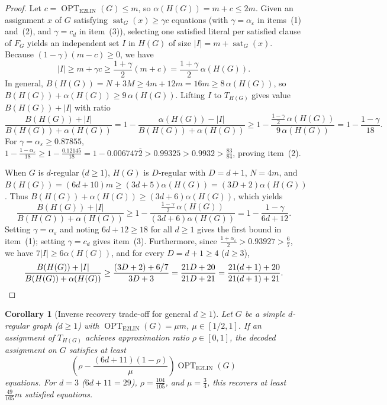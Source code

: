 \documentclass[11pt]{amsart}
\newtheorem{corollary}[theorem]{Corollary}
\begin{document}
\begin{proof}
Let $c = \operatorname{OPT}_{\mathrm{E2LIN}}(G) \le m$, so $\alpha(H(G)) = m + c \le 2m$. Given an assignment $x$ of $G$ satisfying $\operatorname{sat}_G(x) \ge \gamma c$ equations (with $\gamma = \alpha_\varepsilon$ in items~(1) and~(2), and $\gamma = c_d$ in item~(3)), selecting one satisfied literal per satisfied clause of $F_G$ yields an independent set $I$ in $H(G)$ of size $|I| = m + \operatorname{sat}_G(x)$. Because $(1-\gamma)(m-c) \ge 0$, we have
\[
|I| \ge m + \gamma c \ge \frac{1+\gamma}{2}(m+c) = \frac{1+\gamma}{2}\,\alpha(H(G)).
\]
In general, $B(H(G)) = N + 3M \ge 4m + 12m = 16m \ge 8\,\alpha(H(G))$, so $B(H(G)) + \alpha(H(G)) \ge 9\,\alpha(H(G))$. Lifting $I$ to $T_{H(G)}$ gives value $B(H(G)) + |I|$ with ratio
\[
\frac{B(H(G))+|I|}{B(H(G))+\alpha(H(G))} = 1 - \frac{\alpha(H(G)) - |I|}{B(H(G))+\alpha(H(G))} \ge 1 - \frac{\frac{1-\gamma}{2}\,\alpha(H(G))}{9\,\alpha(H(G))} = 1 - \frac{1-\gamma}{18}.
\]
For $\gamma = \alpha_\varepsilon \ge 0.87855$, $1 - \frac{1-\alpha_\varepsilon}{18} \ge 1 - \frac{0.12145}{18} = 1 - 0.006747\overline{2} > 0.99325 > 0.9932 > \frac{83}{84}$, proving item~(2).

When $G$ is $d$-regular ($d \ge 1$), $H(G)$ is $D$-regular with $D = d+1$, $N = 4m$, and $B(H(G)) = (6d+10)m \ge (3d+5)\alpha(H(G)) = (3D+2)\alpha(H(G))$. Thus $B(H(G)) + \alpha(H(G)) \ge (3d+6)\alpha(H(G))$, which yields
\[
\frac{B(H(G))+|I|}{B(H(G))+\alpha(H(G))} \ge 1 - \frac{\frac{1-\gamma}{2}\,\alpha(H(G))}{(3d+6)\alpha(H(G))} = 1 - \frac{1-\gamma}{6d+12}.
\]
Setting $\gamma = \alpha_\varepsilon$ and noting $6d+12 \ge 18$ for all $d \ge 1$ gives the first bound in item~(1); setting $\gamma = c_d$ gives item~(3). Furthermore, since $\frac{1+\alpha_\varepsilon}{2} > 0.93927 > \frac{6}{7}$, we have $7|I| \ge 6\alpha(H(G))$, and for every $D = d+1 \ge 4$ ($d \ge 3$),
\[
\frac{B(H(G))+|I|}{B(H(G))+\alpha(H(G))} \ge \frac{(3D+2) + 6/7}{3D+3} = \frac{21D+20}{21D+21} = \frac{21(d+1)+20}{21(d+1)+21}. \qedhere
\]
\end{proof}

\begin{corollary}[Inverse recovery trade-off for general $d \ge 1$]\label{cor:inverse}
Let $G$ be a simple $d$-regular graph ($d \ge 1$) with $\operatorname{OPT}_{\mathrm{E2LIN}}(G) = \mu m$, $\mu \in [1/2, 1]$. If an assignment of $T_{H(G)}$ achieves approximation ratio $\rho \in [0,1]$, the decoded assignment on $G$ satisfies at least
\[
\left(\rho - \frac{(6d+11)(1-\rho)}{\mu}\right) \operatorname{OPT}_{\mathrm{E2LIN}}(G)
\]
equations. For $d=3$ ($6d+11 = 29$), $\rho = \frac{104}{105}$, and $\mu = \frac{3}{4}$, this recovers at least $\frac{49}{105}m$ satisfied equations.
\end{corollary}
\end{document}

